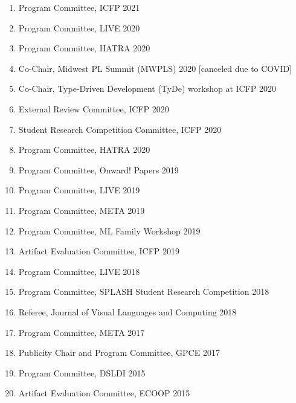 \documentclass[10pt,letterpaper]{article}
\begin{document}
\begin{enumerate}
  \item Program Committee, ICFP 2021
  \item Program Committee, LIVE 2020
  \item Program Committee, HATRA 2020
  \item Co-Chair, Midwest PL Summit (MWPLS) 2020 [canceled due to COVID]
  \item Co-Chair, Type-Driven Development (TyDe) workshop at ICFP 2020
  \item External Review Committee, ICFP 2020
  \item Student Research Competition Committee, ICFP 2020
  \item Program Committee, HATRA 2020
  \item Program Committee, Onward! Papers 2019
  \item Program Committee, LIVE 2019
  \item Program Committee, META 2019
  \item Program Committee, ML Family Workshop 2019
  \item Artifact Evaluation Committee, ICFP 2019
  \item Program Committee, LIVE 2018
  \item Program Committee, SPLASH Student Research Competition 2018
  \item Referee, Journal of Visual Languages and Computing 2018
  \item Program Committee, META 2017
  \item Publicity Chair and Program Committee, GPCE 2017
  \item Program Committee, DSLDI 2015
  \item Artifact Evaluation Committee, ECOOP 2015
\end{enumerate}
\end{document}
